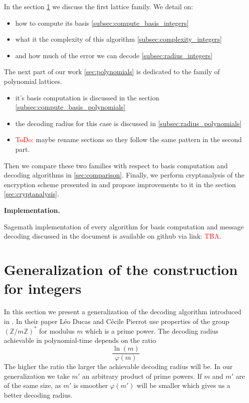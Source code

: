 \documentclass[12pt]{article}
\newcommand{\ZZ}{\mathbb{Z}}
\begin{document}
In the section \ref{sec:gen_integers} we discuss the first lattice family. We detail on:
\begin{itemize}
    \item how to compute its basis \ref{subsec:compute_basis_integers}
    \item what it the complexity of this algorithm \ref{subsec:complexity_integers}
    \item and how much of the error we can decode \ref{subsec:radius_integers}
\end{itemize}
The next part of our work \ref{sec:polynomials} is dedicated to the family of polynomial lattices.
\begin{itemize}
    \item it's basis computation is discussed in the section \ref{subsec:compute_basis_polynomials}
    \item the decoding radius for this case is discussed in \ref{subsec:radius_polynomials}
    \item \textcolor{red}{ToDo:} maybe rename sections so they follow the same pattern in the second part.
\end{itemize}
Then we compare these two families with respect to basis computation and decoding algorithms in \ref{sec:comparison}. Finally, we perform cryptanalysis of the encryption scheme presented in \cite{[LLXY17]} and propose improvements to it in the section \ref{sec:cryptanalysis}.

\textbf{Implementation.}

Sagemath implementation of every algorithm for basis computation and message decoding discussed in the document is available on github via link: \textcolor{red}{TBA}.



\section{Generalization of the construction for integers}
\label{sec:gen_integers}



In this section we present a generalization of the decoding algorithm introduced in \cite{[DP19]}. In their paper Léo Ducas and Cécile Pierrot use properties of the group $(\ZZ/m\ZZ)^*$ for modulus $m$ which is a prime power. The decoding radius achievable in polynomial-time depends on the ratio
\[
\frac{\ln(m)}{\varphi(m)}
\]
The higher the ratio the larger the achievable decoding radius will be. In our generalization we take $m'$ an arbitrary product of prime powers. If $m$ and $m'$ are of the same size, as $m'$ is smoother $\varphi(m')$ will be smaller which gives us a better decoding radius.
\end{document}
